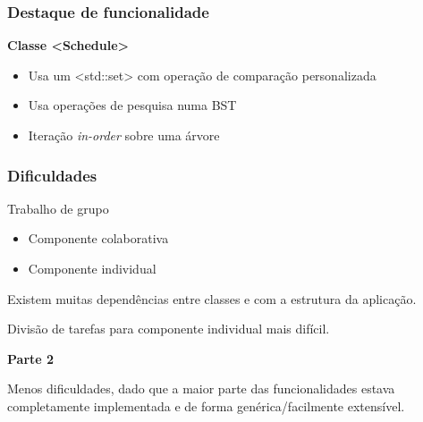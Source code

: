 \documentclass{beamer}
\def\texttt#1{<#1>}
\begin{document}
\begin{frame}
\frametitle{Destaque de funcionalidade}
\textbf{Classe \texttt{Schedule}}\par
\begin{itemize}
	\item	Usa um \texttt{std::set} com operação de comparação personalizada
	\item	Usa operações de pesquisa numa BST
	\item	Iteração \textit{in-order} sobre uma árvore
\end{itemize}
\end{frame}

\begin{frame}
\frametitle{Dificuldades}
Trabalho de grupo
\begin{itemize}
	\item Componente colaborativa
	\item Componente individual
\end{itemize}
Existem muitas dependências entre classes e com a estrutura da aplicação.\par
Divisão de tarefas para componente individual mais difícil.\par
\textbf{Parte 2}\par
Menos dificuldades, dado que a maior parte das funcionalidades estava completamente implementada e de forma genérica/facilmente extensível.
\end{frame}
\end{document}
